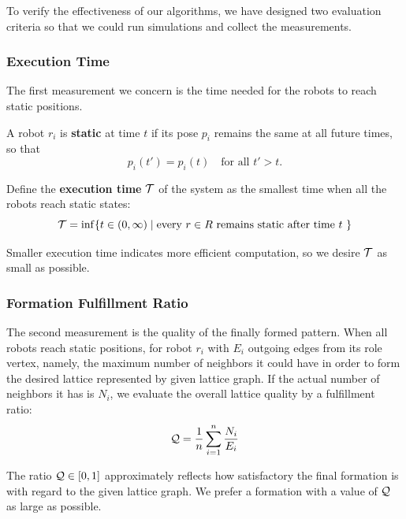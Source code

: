 To verify the effectiveness of our algorithms, we have designed two evaluation criteria so that we could run simulations and collect the measurements.

\subsubsection{Execution Time}
The first measurement we concern is the time needed for the robots to reach static positions.

\begin{defn}
A robot $r_i$ is \textbf{static} at time $t$ if its pose $p_i$
remains the same at all future times, so that 
  \begin{equation}
    p_i(t') = p_i(t) \quad \mbox {for all } t' > t.
  \end{equation}
\end{defn}

Define the \textbf{execution time} $\mathcal{T}$ of the system as the smallest time when all the robots reach static states:
\begin{equation}
  \mathcal{T} = \inf \{t \in (0, \infty) \mid \mbox{every $r \in R$ remains static
    after time $t$ } \}
\end{equation}

Smaller execution time indicates more efficient computation, so we desire $\mathcal{T}$ as small as possible.

\subsubsection{Formation Fulfillment Ratio}

The second measurement is the quality of the finally formed pattern.
%
When all robots reach static positions, for robot $r_i$
with $E_i$ outgoing edges from its role vertex, 
namely, the maximum number of neighbors it could have in order to form the desired lattice represented by given lattice graph. 
If the actual number of neighbors it has is $N_i$, 
we evaluate the overall lattice quality by a fulfillment ratio:
\begin{equation}\label{eq:gamma}
  \mathcal{Q} = \dfrac{1}{n}\sum\limits_{i=1}^n \frac{N_i}{E_i}
\end{equation}

The ratio $\mathcal{Q} \in [0, 1]$ approximately reflects how satisfactory the final formation is 
with regard to the given lattice graph. 
%
We prefer a formation with a value of $\mathcal{Q}$ as large as possible.

